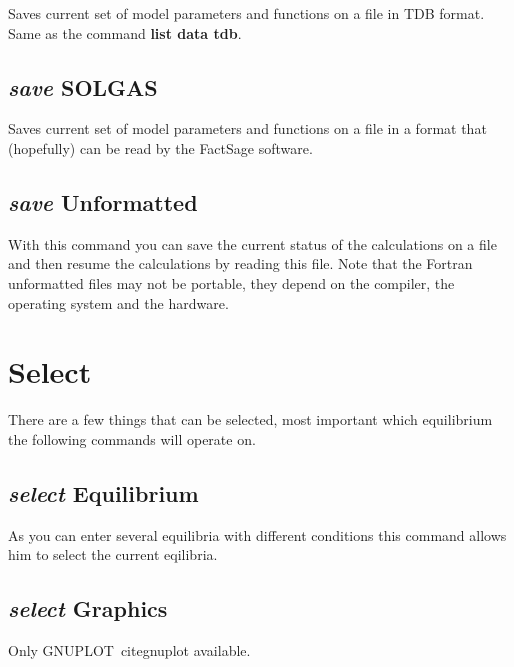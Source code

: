 \documentclass[11pt]{article}
\begin{document}
Saves current set of model parameters and functions on a file in TDB
format.  Same as the command {\bf list data tdb}.

\hypertarget{Save SOLGAS}{}
\subsection{{\em save} SOLGAS}

Saves current set of model parameters and functions on a file in a
format that (hopefully) can be read by the FactSage software.

\hypertarget{Save unformatted}{}
\subsection{{\em save} Unformatted}\label{sc:saveunf}

With this command you can save the current status of the calculations
on a file and then resume the calculations by reading this file.  Note
that the Fortran unformatted files may not be portable, they depend on
the compiler, the operating system and the hardware.

\hypertarget{Select}{}
\section{Select }

There are a few things that can be selected, most important which
equilibrium the following commands will operate on.

\hypertarget{Select equilibrium}{}
\subsection{{\em select} Equilibrium}

As you can enter several equilibria with different conditions
this command allows him to select the current eqilibria.

\hypertarget{Select graphics}{}
\subsection{{\em select} Graphics}

Only GNUPLOT~cite{gnuplot} available.

\hypertarget{Select language}{}
\end{document}
